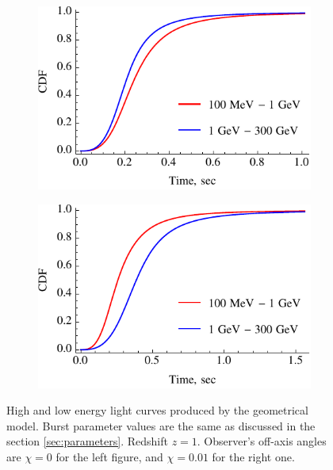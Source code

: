 \documentclass{article}
\begin{document}
\begin{figure}
	\centering
	\begin{subfigure}{0.49\textwidth}
		\includegraphics[width=\textwidth]{sampleLightCurveLogNegative}
		\label{fig:sampleLightCurveLogNegative}
	\end{subfigure}
	\begin{subfigure}{0.49\textwidth}
		\includegraphics[width=\textwidth]{sampleLightCurveLogPositive}
		\label{fig:sampleLightCurveLogPosivie}
	\end{subfigure}
	\caption{
		High and low energy light curves produced by the geometrical model. Burst parameter values are the same as discussed in the section \ref{sec:parameters}. Redshift $z = 1$. Observer's off-axis angles are $\chi = 0$ for the left figure, and $\chi = 0.01$ for the right one.
	}
	\label{fig:sampleLightCurves}
\end{figure}
\end{document}

